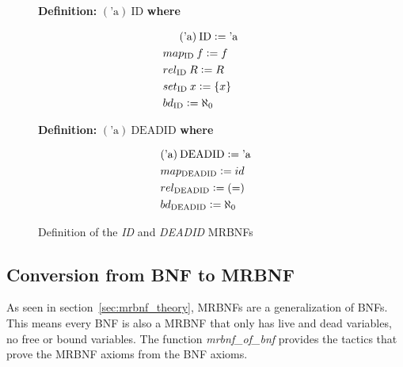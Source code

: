 \begin{figure}
\centering
\begin{minipage}[t]{0.34\textwidth}
\noindent
\textbf{Definition:} $(\text{'a}) \: \text{ID}$ \textbf{where}

\vspace*{-2em}

\begin{adjustwidth}{-1em}{0em}
\begin{align*}
& \ms (\text{'a}) \: \text{ID} \defeq \text{'a} &&\\
& map_{\text{ID}} \: f \defeq f &&\\
& rel_{\text{ID}} \: R \defeq R &&\\
& set_{\text{ID}} \: x \defeq \{ x \}  &&\\
& bd_{\text{ID}} \defeq \aleph_0 &&\\
\end{align*}
\end{adjustwidth}
\vspace*{-2em}
\end{minipage}%
\begin{minipage}[t]{0.34\textwidth}
\noindent
\textbf{Definition:} $(\text{'a}) \: \text{DEADID}$ \textbf{where}

\vspace*{-2em}

\begin{adjustwidth}{-1em}{0em}
\begin{align*}
& (\text{'a}) \: \text{DEADID} \vcentcolon= \text{'a} \\
& map_{\text{DEADID}} \vcentcolon= id \\
& rel_{\text{DEADID}} \vcentcolon= (=) \\
& bd_{\text{DEADID}} \vcentcolon= \aleph_0
\end{align*}
\end{adjustwidth}
\vspace*{-2em}
\end{minipage}

\caption{Definition of the \textit{ID} and \textit{DEADID} \acp{MRBNF}}\label{fig:id_deadid}
\end{figure}

\subsection{Conversion from \acs{BNF} to \acs{MRBNF}}\label{sec:conversion}

As seen in section~\ref{sec:mrbnf_theory}, \acp{MRBNF} are a generalization of \acp{BNF}. This means every \ac{BNF} is also a \ac{MRBNF} that only has live and dead variables, no free or bound variables. The function \textit{mrbnf\_of\_bnf} provides the tactics that prove the \ac{MRBNF} axioms from the \ac{BNF} axioms.

